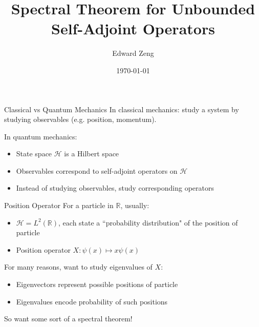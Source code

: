 \documentclass{beamer}
\title[Spectral Theorem]{Spectral Theorem for Unbounded Self-Adjoint Operators}
\author[E. Zeng]{Edward Zeng}
\institute[UC Berkeley]{University of California, Berkeley \protect\\ DRP}
\date{\today}
\theoremstyle{plain}
\theoremstyle{definition}
\newcommand{\cH}{{\mathcal H}}
\newcommand{\bR}{{\mathbb R}}
\begin{document}
\maketitle

\begin{frame}{Classical vs Quantum Mechanics}
    In classical mechanics: study a system by studying observables (e.g. position, momentum).

    \bigskip
    In quantum mechanics:
    \begin{itemize}
        \item State space $\cH$ is a Hilbert space
        \item Observables correspond to self-adjoint operators on $\cH$
        \item Instead of studying observables, study corresponding operators
    \end{itemize}
\end{frame}

\begin{frame}{Position Operator}
    For a particle in $\bR$, usually:
    \begin{itemize}
        \item $\cH = L^2(\bR)$, each state a ``probability distribution" of the position of particle
        \item Position operator $X: \psi(x) \mapsto x\psi(x)$
    \end{itemize}

    \pause
    \bigskip
    For many reasons, want to study eigenvalues of $X$:
    \begin{itemize}
        \item Eigenvectors represent possible positions of particle
        \item Eigenvalues encode probability of such positions
    \end{itemize}
    So want some sort of a spectral theorem!
\end{frame}
\end{document}
